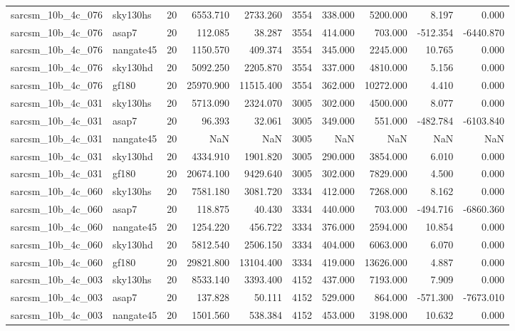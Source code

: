 \documentclass{article}
\begin{document}
\begin{longtable}{llrrrrrrrr}
sarcsm\_10b\_4c\_076 & sky130hs & 20 & 6553.710 & 2733.260 & 3554 & 338.000 & 5200.000 & 8.197 & 0.000 \\
sarcsm\_10b\_4c\_076 & asap7 & 20 & 112.085 & 38.287 & 3554 & 414.000 & 703.000 & -512.354 & -6440.870 \\
sarcsm\_10b\_4c\_076 & nangate45 & 20 & 1150.570 & 409.374 & 3554 & 345.000 & 2245.000 & 10.765 & 0.000 \\
sarcsm\_10b\_4c\_076 & sky130hd & 20 & 5092.250 & 2205.870 & 3554 & 337.000 & 4810.000 & 5.156 & 0.000 \\
sarcsm\_10b\_4c\_076 & gf180 & 20 & 25970.900 & 11515.400 & 3554 & 362.000 & 10272.000 & 4.410 & 0.000 \\
sarcsm\_10b\_4c\_031 & sky130hs & 20 & 5713.090 & 2324.070 & 3005 & 302.000 & 4500.000 & 8.077 & 0.000 \\
sarcsm\_10b\_4c\_031 & asap7 & 20 & 96.393 & 32.061 & 3005 & 349.000 & 551.000 & -482.784 & -6103.840 \\
sarcsm\_10b\_4c\_031 & nangate45 & 20 & NaN & NaN & 3005 & NaN & NaN & NaN & NaN \\
sarcsm\_10b\_4c\_031 & sky130hd & 20 & 4334.910 & 1901.820 & 3005 & 290.000 & 3854.000 & 6.010 & 0.000 \\
sarcsm\_10b\_4c\_031 & gf180 & 20 & 20674.100 & 9429.640 & 3005 & 302.000 & 7829.000 & 4.500 & 0.000 \\
sarcsm\_10b\_4c\_060 & sky130hs & 20 & 7581.180 & 3081.720 & 3334 & 412.000 & 7268.000 & 8.162 & 0.000 \\
sarcsm\_10b\_4c\_060 & asap7 & 20 & 118.875 & 40.430 & 3334 & 440.000 & 703.000 & -494.716 & -6860.360 \\
sarcsm\_10b\_4c\_060 & nangate45 & 20 & 1254.220 & 456.722 & 3334 & 376.000 & 2594.000 & 10.854 & 0.000 \\
sarcsm\_10b\_4c\_060 & sky130hd & 20 & 5812.540 & 2506.150 & 3334 & 404.000 & 6063.000 & 6.070 & 0.000 \\
sarcsm\_10b\_4c\_060 & gf180 & 20 & 29821.800 & 13104.400 & 3334 & 419.000 & 13626.000 & 4.887 & 0.000 \\
sarcsm\_10b\_4c\_003 & sky130hs & 20 & 8533.140 & 3393.400 & 4152 & 437.000 & 7193.000 & 7.909 & 0.000 \\
sarcsm\_10b\_4c\_003 & asap7 & 20 & 137.828 & 50.111 & 4152 & 529.000 & 864.000 & -571.300 & -7673.010 \\
sarcsm\_10b\_4c\_003 & nangate45 & 20 & 1501.560 & 538.384 & 4152 & 453.000 & 3198.000 & 10.632 & 0.000 \\

\end{longtable}
\end{document}
